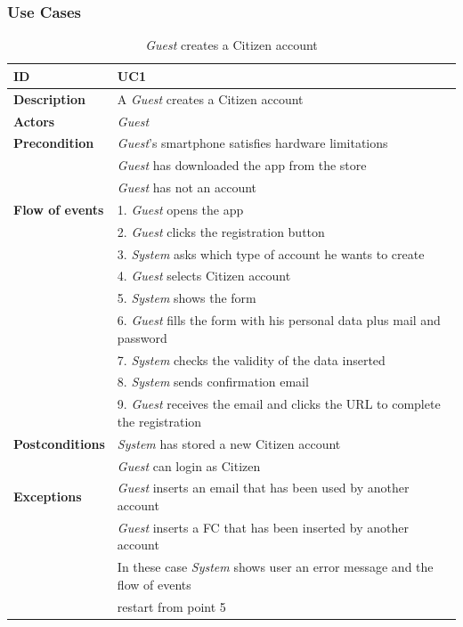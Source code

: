 \documentclass{article}
\begin{document}
\subsubsection{Use Cases}
\clearpage
\begin{table}
    \begin{center}
    \centering
\begin{tabular}{ | l | l |}
\hline
\textbf{ID} & UC1 \\
\hline
\textbf{Description} & A \textit{Guest} creates a Citizen account \\
\hline
\textbf{Actors} & \textit{Guest} \\
\hline
\textbf{Precondition} & \textit{Guest}'s smartphone satisfies hardware limitations \\
             & \textit{Guest} has downloaded the app from the store \\
             & \textit{Guest} has not an account\\ 
\hline
\textbf{Flow of events} & 1. \textit{Guest} opens the app \\
                        & 2. \textit{Guest} clicks the registration button \\
                        & 3. \textit{System} asks which type of account he wants to create \\
                        & 4. \textit{Guest} selects Citizen account \\
                        & 5. \textit{System} shows the form \\
                        & 6. \textit{Guest} fills the form with his personal data plus mail and password \\
                        & 7. \textit{System} checks the validity of the data inserted \\
                        & 8. \textit{System} sends confirmation email \\
                        & 9. \textit{Guest} receives the email and clicks the URL to complete the registration \\  
\hline
\textbf{Postconditions} & \textit{System} has stored a new Citizen account  \\
                        & \textit{Guest} can login as Citizen \\
\hline
\textbf{Exceptions} & \textit{Guest} inserts an email that has been used by another account \\
                    & \textit{Guest} inserts a FC that has been inserted by another account \\
                    & In these case \textit{System} shows user an error message and the flow of events  \\
                    & restart from point 5 \\  
\hline
\end{tabular}
\caption{\textit{Guest} creates a Citizen account}
\end{center}
\end{table}
\end{document}
